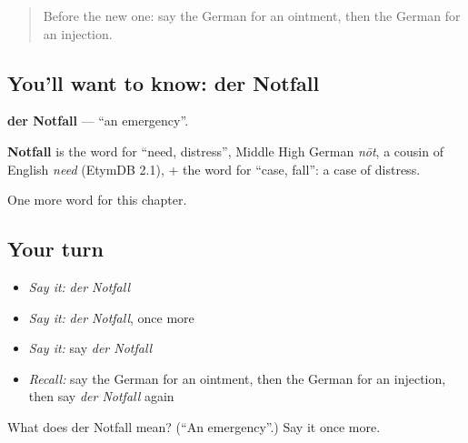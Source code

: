 \begin{quote}
Before the new one: say the German for an ointment, then the German for an injection.
\end{quote}

\subsection*{You'll want to know: der Notfall}
\textbf{der Notfall} — \textquotedblleft{}an emergency\textquotedblright{}.

\begin{cousinweb}
\textbf{Notfall} is the word for \textquotedblleft{}need, distress\textquotedblright{}, Middle High German \emph{nōt}, a cousin of English \emph{need} (EtymDB 2.1), + the word for \textquotedblleft{}case, fall\textquotedblright{}: a case of distress.
\end{cousinweb}

\begin{grammarlens}[title={What you've built}]
One more word for this chapter.
\end{grammarlens}

\subsection*{Your turn}
\begin{itemize}
\raggedright
  \item \emph{Say it:} \emph{der Notfall}
  \item \emph{Say it:} \emph{der Notfall}, once more
  \item \emph{Say it:} say \emph{der Notfall}
  \item \emph{Recall:} say the German for an ointment, then the German for an injection, then say \emph{der Notfall} again
\end{itemize}

\begin{tcolorbox}[breakable,colback=teal!4,colframe=teal!35!black,title={Before you move on}]
What does der Notfall mean? (\textquotedblleft{}An emergency\textquotedblright{}.) Say it once more.
\end{tcolorbox}
